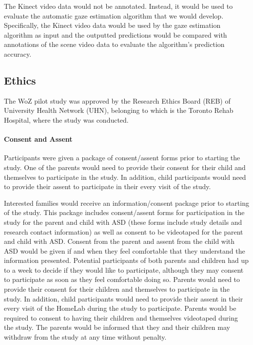 The Kinect video data would not be annotated. Instead, it would be used to evaluate the automatic gaze estimation algorithm that we would develop. Specifically, the Kinect video data would be used by the gaze estimation algorithm as input and the outputted predictions would be compared with annotations of the scene video data to evaluate the algorithm's prediction accuracy.



\subsection{Ethics}
The WoZ pilot study was approved by the Research Ethics Board (REB) of University Health Network (UHN), belonging to which is the Toronto Rehab Hospital, where the study was conducted.

\paragraph{Consent and Assent}
Participants were given a package of consent/assent forms prior to starting the study. One of the parents would need to provide their consent for their child and themselves to participate in the study. In addition, child participants would need to provide their assent to participate in their every visit of the study. 

Interested families would receive an information/consent package prior to starting of the study. This package includes consent/assent forms for participation in the study for the parent and child with ASD (these forms include study details and research contact information) as well as consent to be videotaped for the parent and child with ASD. Consent from the parent and assent from the child with ASD would be given if and when they feel comfortable that they understand the information presented. Potential participants of both parents and children had up to a week to decide if they would like to participate, although they may consent to participate as soon as they feel comfortable doing so. Parents would need to provide their consent for their children and themselves to participate in the study. In addition, child participants would need to provide their assent in their every visit of the HomeLab during the study to participate. Parents would be required to consent to having their children and themselves videotaped during the study. The parents would be informed that they and their children may withdraw from the study at any time without penalty.

